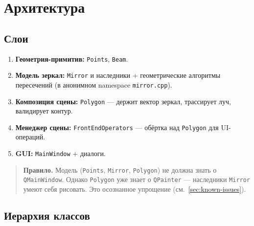 \documentclass[a4paper,11pt]{article}
\newcommand{\file}[1]{\texttt{#1}}
\newcommand{\code}[1]{\texttt{#1}}
\begin{document}
\section{Архитектура}

\subsection{Слои}

\begin{enumerate}[label=\textbf{\arabic*.},leftmargin=*]
    \item \textbf{Геометрия-примитив:} \code{Points}, \code{Beam}.
    \item \textbf{Модель зеркал:} \code{Mirror} и наследники + геометрические
          алгоритмы пересечений (в анонимном namespace \file{mirror.cpp}).
    \item \textbf{Композиция сцены:} \code{Polygon} — держит вектор зеркал,
          трассирует луч, валидирует контур.
    \item \textbf{Менеджер сцены:} \code{FrontEndOperators} — обёртка над
          \code{Polygon} для UI-операций.
    \item \textbf{GUI:} \code{MainWindow} + диалоги.
\end{enumerate}

\begin{quote}
\textbf{Правило.} Модель (\code{Points}, \code{Mirror}, \code{Polygon}) не
должна знать о \code{QMainWindow}. Однако \code{Polygon} уже знает о
\code{QPainter} — наследники \code{Mirror} умеют себя рисовать. Это
осознанное упрощение (см.~\ref{sec:known-issues}).
\end{quote}

\subsection{Иерархия классов}

\begin{center}
\end{center}
\end{document}
